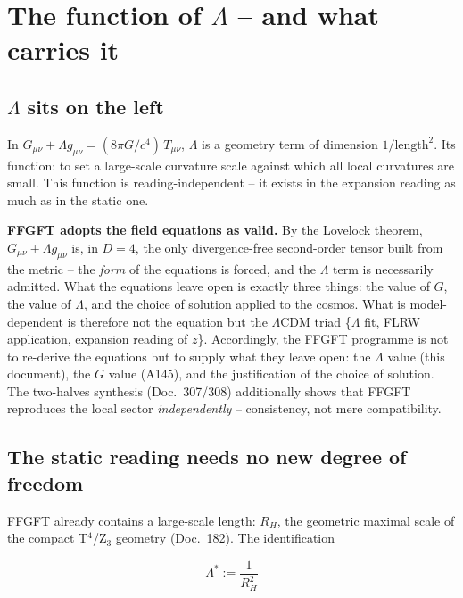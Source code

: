 \documentclass[11pt]{report}
\begin{document}
\chapter{The function of $\Lambda$ -- and what carries it}

\section{$\Lambda$ sits on the left}

In $G_{\mu\nu} + \Lambda g_{\mu\nu} = (8\pi G/c^4)\,T_{\mu\nu}$,
$\Lambda$ is a geometry term of dimension $1/\text{length}^2$. Its
function: to set a large-scale curvature scale against which all
local curvatures are small. This function is reading-independent --
it exists in the expansion reading as much as in the static one.

\textbf{FFGFT adopts the field equations as valid.} By the Lovelock
theorem, $G_{\mu\nu} + \Lambda g_{\mu\nu}$ is, in $D=4$, the only
divergence-free second-order tensor built from the metric -- the
\emph{form} of the equations is forced, and the $\Lambda$ term is
necessarily admitted. What the equations leave open is exactly three
things: the value of $G$, the value of $\Lambda$, and the choice of
solution applied to the cosmos. What is model-dependent is therefore
not the equation but the $\Lambda$CDM triad
\{$\Lambda$ fit, FLRW application, expansion reading of $z$\}.
Accordingly, the FFGFT programme is not to re-derive the equations
but to supply what they leave open: the $\Lambda$ value (this
document), the $G$ value (A145), and the justification of the choice
of solution. The two-halves synthesis (Doc.~307/308) additionally
shows that FFGFT reproduces the local sector \emph{independently} --
consistency, not mere compatibility.

\section{The static reading needs no new degree of freedom}

FFGFT already contains a large-scale length: $R_H$, the geometric
maximal scale of the compact T$^4$/Z$_3$ geometry (Doc.~182). The
identification

\begin{equation}
  \Lambda^{*} := \frac{1}{R_H^2}
  \label{eq:def}
\end{equation}
\end{document}
